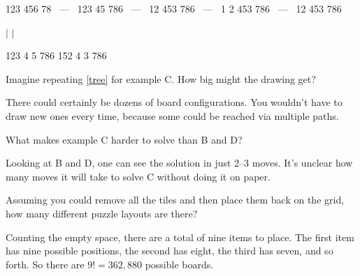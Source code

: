 \begin{answer}[14em]
\begin{center}
\board
{1}{2}{3}
{4}{5}{6}
{7}{8}{ }
~---~
\board
{1}{2}{3}
{4}{5}{ }
{7}{8}{6}
~---~
\board
{1}{2}{ }
{4}{5}{3}
{7}{8}{6}
~---~
\board
{1}{ }{2}
{4}{5}{3}
{7}{8}{6}
~---~
\board
{ }{1}{2}
{4}{5}{3}
{7}{8}{6}

\medskip
{\bf $|$}
\hspace{197pt}
{\bf $|$}
\medskip

\board
{1}{2}{3}
{4}{ }{5}
{7}{8}{6}
\hspace{121pt}
\board
{1}{5}{2}
{4}{ }{3}
{7}{8}{6}
\end{center}
\end{answer}


\Q Imagine repeating \ref{tree} for example C. How big might the drawing get?

\begin{answer}
There could certainly be dozens of board configurations.
You wouldn't have to draw new ones every time, because some could be reached via multiple paths.
\end{answer}


\Q What makes example C harder to solve than B and D?

\begin{answer}
Looking at B and D, one can see the solution in just 2--3 moves.
It's unclear how many moves it will take to solve C without doing it on paper.
\end{answer}


\Q Assuming you could remove all the tiles and then place them back on the grid, how many different puzzle layouts are there?

\begin{answer}
Counting the empty space, there are a total of nine items to place.
The first item has nine possible positions, the second has eight, the third has seven, and so forth.
So there are $9! = 362,880$ possible boards.
\end{answer}





